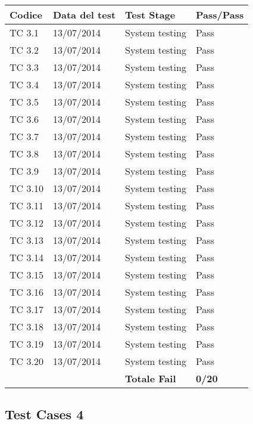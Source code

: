 \begin{tabular}{|p{3cm}|p{3cm}|p{3cm}|p{3cm}|}
	\hline
	\rowcolor{Gray}
	\textbf{Codice} & \textbf{Data del test} & \textbf{Test Stage} & \textbf{Pass/Pass}\tabularnewline
	\hline
	TC 3.1			& 13/07/2014 			& System testing		& Pass \tabularnewline
	\hline
	TC 3.2			& 13/07/2014 			& System testing		& Pass \tabularnewline
	\hline
	TC 3.3			& 13/07/2014 			& System testing		& Pass \tabularnewline
	\hline
	TC 3.4			& 13/07/2014 			& System testing		& Pass \tabularnewline
	\hline
	TC 3.5			& 13/07/2014 			& System testing		& Pass \tabularnewline
	\hline
	TC 3.6			& 13/07/2014 			& System testing		& Pass \tabularnewline
	\hline
	TC 3.7			& 13/07/2014 			& System testing		& Pass \tabularnewline
	\hline
	TC 3.8			& 13/07/2014 			& System testing		& Pass \tabularnewline
	\hline
	TC 3.9			& 13/07/2014 			& System testing		& Pass \tabularnewline
	\hline
	TC 3.10			& 13/07/2014 			& System testing		& Pass \tabularnewline
	\hline
	TC 3.11			& 13/07/2014 			& System testing		& Pass \tabularnewline
	\hline
	TC 3.12			& 13/07/2014 			& System testing		& Pass \tabularnewline
	\hline
	TC 3.13			& 13/07/2014 			& System testing		& Pass \tabularnewline
	\hline
	TC 3.14			& 13/07/2014 			& System testing		& Pass \tabularnewline
	\hline
	TC 3.15			& 13/07/2014 			& System testing		& Pass \tabularnewline
	\hline
	TC 3.16			& 13/07/2014 			& System testing		& Pass \tabularnewline
	\hline
	TC 3.17			& 13/07/2014 			& System testing		& Pass \tabularnewline
	\hline
	TC 3.18			& 13/07/2014 			& System testing		& Pass \tabularnewline
	\hline
	TC 3.19			& 13/07/2014 			& System testing		& Pass \tabularnewline
	\hline
	TC 3.20			& 13/07/2014 			& System testing		& Pass \tabularnewline
	\hline
					& 						& \textbf{Totale Fail}	& \textbf{0/20} \tabularnewline
	\hline
\end{tabular}

\subsection{Test Cases 4}

